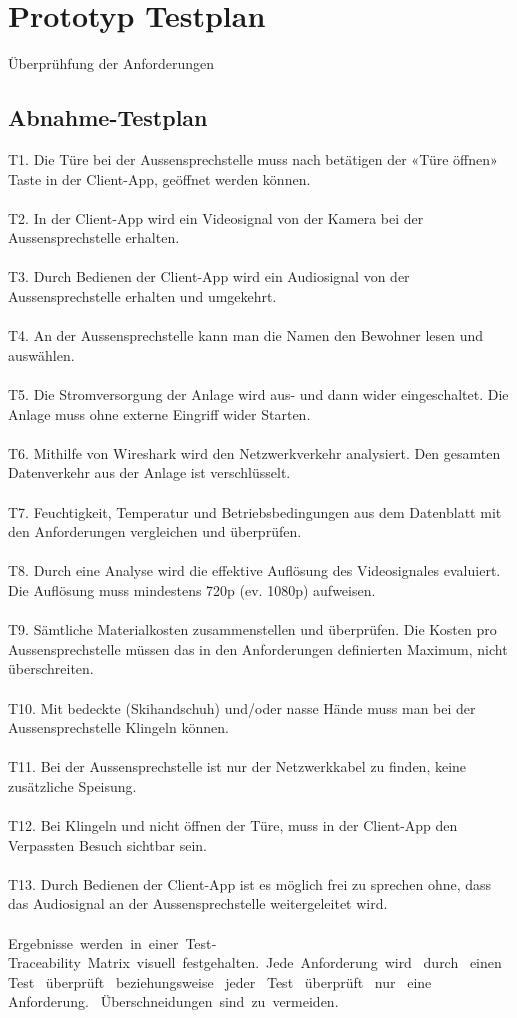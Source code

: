 \section{Prototyp Testplan}
\label{sec:testabnahme}
Überprühfung der Anforderungen
\subsection{Abnahme-Testplan}
T1. Die Türe bei der Aussensprechstelle muss nach betätigen der «Türe öffnen» Taste in der Client-App, geöffnet werden können.
\\
\\
T2. In der Client-App wird ein Videosignal von der Kamera bei der Aussensprechstelle erhalten. 
\\
\\
T3. Durch Bedienen der Client-App wird ein Audiosignal von der Aussensprechstelle erhalten und umgekehrt. 
\\
\\
T4. An der Aussensprechstelle kann man die Namen den Bewohner lesen und auswählen.  
\\
\\
T5. Die Stromversorgung der Anlage wird aus- und dann wider eingeschaltet. Die Anlage muss ohne externe Eingriff wider Starten. 
\\
\\
T6. Mithilfe von Wireshark wird den Netzwerkverkehr analysiert. Den gesamten Datenverkehr aus der Anlage ist verschlüsselt. 
\\
\\
T7. Feuchtigkeit, Temperatur und Betriebsbedingungen aus dem Datenblatt mit den Anforderungen vergleichen und überprüfen.
\\
\\  
T8. Durch eine Analyse wird die effektive Auflösung des Videosignales evaluiert. Die Auflösung muss mindestens 720p (ev. 1080p) aufweisen. 
\\
\\
T9. Sämtliche Materialkosten zusammenstellen und überprüfen. Die Kosten pro Aussensprechstelle müssen das in den Anforderungen definierten Maximum, nicht überschreiten. 
\\
\\
T10.  Mit bedeckte (Skihandschuh) und/oder nasse Hände muss man bei der Aussensprechstelle Klingeln können. 
\\
\\
T11. Bei der Aussensprechstelle ist nur der Netzwerkkabel zu finden, keine zusätzliche Speisung. 
\\
\\
T12.  Bei Klingeln und nicht öffnen der Türe, muss in der Client-App den Verpassten Besuch sichtbar sein. 
\\
\\
T13. Durch Bedienen der Client-App ist es möglich frei zu sprechen ohne, dass das Audiosignal an der Aussensprechstelle weitergeleitet wird.
\\
\\
Ergebnisse werden in einer Test‐Traceability Matrix visuell festgehalten. Jede Anforderung wird  durch  einen  Test  überprüft  beziehungsweise  jeder  Test  überprüft  nur  eine  Anforderung.  Überschneidungen sind zu vermeiden.
